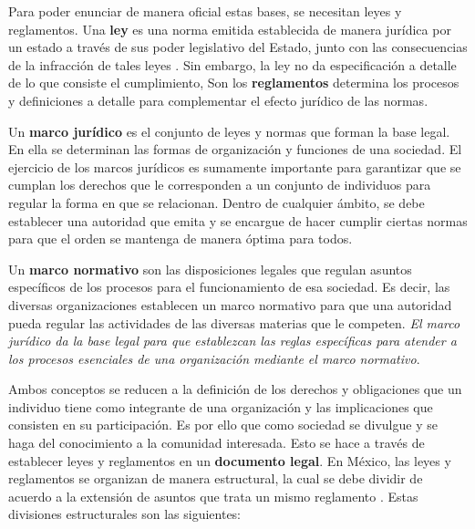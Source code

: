 Para poder enunciar de manera oficial estas bases, se necesitan leyes y reglamentos. Una \textbf{ley} es una norma emitida establecida de manera jurídica por un estado a través de sus poder legislativo del Estado, junto con las consecuencias de la infracción de tales leyes \parencite{davidrogers}. Sin embargo, la ley no da especificación a detalle de lo que consiste el cumplimiento, Son los \textbf{reglamentos} determina los procesos y definiciones a detalle para complementar el efecto jurídico de las normas. 

Un \textbf{marco jurídico} es el conjunto de leyes y normas que forman la base legal. En ella se determinan las formas de organización y funciones de una sociedad. El ejercicio de los marcos jurídicos es sumamente importante para garantizar que se cumplan los derechos que le corresponden a un conjunto de individuos para regular la forma en que se relacionan. Dentro de cualquier ámbito, se debe establecer una autoridad que emita y se encargue de hacer cumplir ciertas normas para que el orden se mantenga de manera óptima para todos.

Un \textbf{marco normativo} son las disposiciones legales que regulan asuntos específicos de los procesos para el funcionamiento de esa sociedad. Es decir, las diversas organizaciones establecen un marco normativo para que una autoridad pueda regular las actividades de las diversas materias que le competen. \textit{El marco jurídico da la base legal para que establezcan las reglas específicas para atender a los procesos esenciales de una organización mediante el marco normativo}.

Ambos conceptos se reducen a la definición de los derechos y obligaciones que un individuo tiene como integrante de una organización y las implicaciones que consisten en su participación. Es por ello que como sociedad se divulgue y se haga del conocimiento a la comunidad interesada. Esto se hace a través de establecer leyes y reglamentos en un \textbf{documento legal}. En México, las leyes y reglamentos se organizan de manera estructural, la cual se debe dividir de acuerdo a la extensión de asuntos que trata un mismo reglamento \parencite{lopezruiz}. Estas divisiones estructurales son las siguientes:


